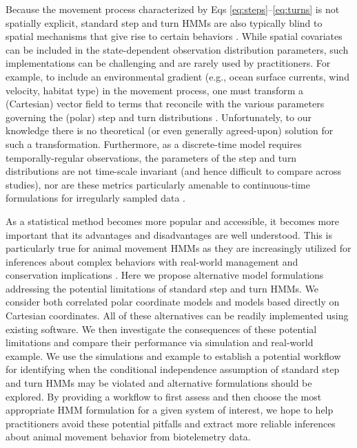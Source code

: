 \documentclass[12pt]{article}\usepackage[]{graphicx}\usepackage[]{xcolor}
\begin{document}
Because the movement process characterized by Eqs \ref{eq:steps}--\ref{eq:turns} is not spatially explicit, standard step and turn HMMs are also typically blind to spatial mechanisms that give rise to certain behaviors \citep[e.g.,][]{glennie2023hidden}. While spatial covariates can be included in the state-dependent observation distribution parameters, such implementations can be challenging and are rarely used by practitioners. For example, to include an environmental gradient (e.g., ocean surface currents, wind velocity, habitat type) in the movement process, one must transform a (Cartesian) vector field to terms that reconcile with the various parameters governing the (polar) step and turn distributions \citep[e.g.,][]{McClintockMichelot2018,PirottaEtAl2018,mul2020killer}. Unfortunately, to our knowledge there is no theoretical (or even generally agreed-upon) solution for such a transformation. Furthermore, as a discrete-time model requires temporally-regular observations, the parameters of the step and turn distributions are not time-scale invariant (and hence difficult to compare across studies), nor are these metrics particularly amenable to continuous-time formulations for irregularly sampled data \citep[but see][]{parton2017bayesian,eisaguirre2024rayleigh}.%

As a statistical method becomes more popular and accessible, it becomes more important that its advantages and disadvantages are well understood. This is particularly true for animal movement HMMs as they are increasingly utilized for inferences about complex behaviors with real-world management and conservation implications \citep[e.g.,][]{russell2014marine,CarterEtAl2020,mul2020killer,nickel2021energetics,bassing2024predator}. Here we propose alternative model formulations addressing the potential limitations of standard step and turn HMMs. We consider both correlated polar coordinate models and models based directly on Cartesian coordinates. All of these alternatives can be readily implemented using existing software. We then investigate the consequences of these potential limitations and compare their performance via simulation and real-world example. We use the simulations and example to establish a potential workflow for identifying when the conditional independence assumption of standard step and turn HMMs may be violated and alternative formulations should be explored. By providing a workflow to first assess and then choose the most appropriate HMM formulation for a given system of interest, we hope to help practitioners avoid these potential pitfalls and extract more reliable inferences about animal movement behavior from biotelemetry data.
\end{document}
